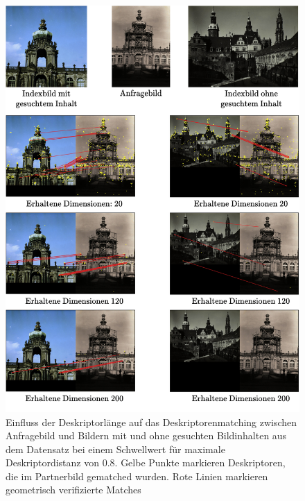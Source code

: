 \begin{figure}[H]
\centering
\includegraphics[scale=0.86]{influence_dim}
\caption{Einfluss der Deskriptorlänge auf das Deskriptorenmatching zwischen Anfragebild und Bildern mit und ohne gesuchten Bildinhalten aus dem Datensatz bei einem Schwellwert für maximale Deskriptordistanz von $0.8$. Gelbe Punkte markieren Deskriptoren, die im Partnerbild gematched wurden. Rote Linien markieren geometrisch verifizierte Matches}
\label{influence_dim}
\end{figure}

